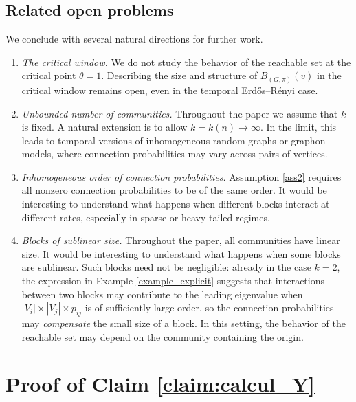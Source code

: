 \documentclass[11pt]{article}
\numberwithin{equation}{section}
\theoremstyle{definition}
\begin{document}
\subsection{Related open problems}

We conclude with several natural directions for further work.

\begin{enumerate}
    \item \emph{The critical window.}
    We do not study the behavior of the reachable set at the critical point $\theta=1$. Describing the size and structure of $B_{(G,\pi)}(v)$ in the critical window remains open, even in the temporal Erd\H os--R\'enyi case.
    \item \emph{Unbounded number of communities.}
    Throughout the paper we assume that $k$ is fixed. A natural extension is to allow $k=k(n)\to\infty$. In the limit, this leads to temporal versions of inhomogeneous random graphs or graphon models, where connection probabilities may vary across pairs of vertices.

    \item \emph{Inhomogeneous order of connection probabilities.}
    Assumption \ref{ass2} requires all nonzero connection probabilities to be of the same order. It would be interesting to understand what happens when different blocks interact at different rates, especially in sparse or heavy-tailed regimes.
    
    \item \emph{Blocks of sublinear size.}
    Throughout the paper, all communities have linear size. It would be interesting to understand what happens when some blocks are sublinear. Such blocks need not be negligible: already in the case $k=2$, the expression in Example \ref{example_explicit} suggests that interactions between two blocks may contribute to the leading eigenvalue when $|V_i|\times|V_j|\times p_{ij}$ is of sufficiently large order, so the connection probabilities may \emph{compensate} the small size of a block. In this setting, the behavior of the reachable set may depend on the community containing the origin.
\end{enumerate}



\newpage
\appendix
\section{Proof of Claim \ref{claim:calcul_Y}}
\label{proof:claim}
\end{document}
